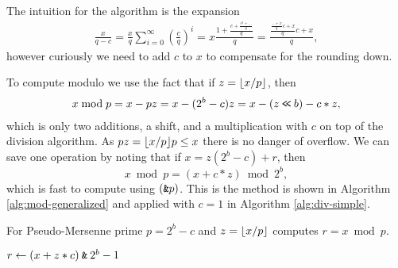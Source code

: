 The intuition for the algorithm is the expansion
\begin{align}
   \frac{x}{q-c}
   = \frac{x}{q}\sum_{i=0}^\infty \left(\frac{c}{q}\right)^i
   = x\frac{1+\frac{c+\frac{c^2 + \dots}{q}}{q}}{q}
   = \frac{\frac{\frac{\dots+x}{q}c+x}{q}c+x}{q},
\end{align}
however curiously we need to add $c$ to $x$ to compensate for the rounding down.









To compute modulo we use the fact that if $z=\lfloor {x/p} \rfloor$, then
\begin{align}
   x \bmod p
   = x - pz
   = x - (2^b-c)z
   = x - (z\mathbin{\texttt{<\!<}} b) - c*z,
\end{align}
which is only two additions, a shift, and a multiplication with $c$ on top of the division algorithm.
As $pz = \lfloor {x/p} \rfloor p \le x$ there is no danger of overflow.
We can save one operation by noting
that if $x = z (2^b-c) + r$, then
$$x\bmod p = \left(x+c*z \right) \bmod 2^b,$$
which is fast to compute using $(\mathbin{\texttt{\&}} p)$.
This is the method is shown in Algorithm \ref{alg:mod-generalized} and applied with $c=1$ in Algorithm \ref{alg:div-simple}.

\begin{algorithm}[H]
   \caption{For Pseudo-Mersenne prime $p=2^b-c$ and $z=\lfloor {x/p} \rfloor$ computes
      $r=x \bmod p$.}
   \label{alg:mod-generalized}
   \begin{algorithmic}
      \State $r \gets (x + z*c) \mathbin{\texttt{\&}} 2^b-1$
   \end{algorithmic}
\end{algorithm}




